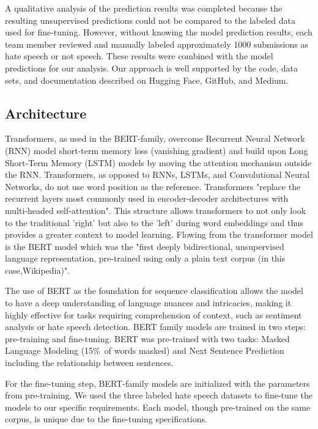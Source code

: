 \documentclass[conference]{IEEEtran}
\begin{document}
A qualitative analysis of the prediction results was completed because the resulting unsupervised predictions could not be compared to the labeled data used for fine-tuning. However, without knowing the model prediction results, each team member reviewed and manually labeled approximately 1000 submissions as hate speech or not speech. These results were combined with the model predictions for our analysis. Our approach is well supported by the code, data sets, and documentation described on Hugging Face\cite{b9}, GitHub\cite{b10}, and Medium\cite{b11}.

\subsection{Architecture}
Transformers, as used in the BERT-family, overcome Recurrent Neural Network (RNN) model short-term memory loss (vanishing gradient) and build upon Long Short-Term Memory (LSTM) models by moving the attention mechanism outside the RNN. Transformers, as opposed to RNNs, LSTMs, and Convolutional Neural Networks, do not use word position as the reference\cite{b12}. Transformers "replace the recurrent layers most commonly used in encoder-decoder architectures with multi-headed self-attention"\cite{b13}. This structure allows transformers to not only look to the traditional 'right' but also to the 'left' during word embeddings and thus provides a greater context to model learning. Flowing from the transformer model is the BERT model which was the "first deeply bidirectional, unsupervised language representation, pre-trained using only a plain text corpus (in this case,Wikipedia)"\cite{b14}.

The use of BERT as the foundation for sequence classification allows the model to have a deep understanding of language nuances and intricacies, making it highly effective for tasks requiring comprehension of context, such as sentiment analysis or hate speech detection\cite{b15}. BERT family models are trained in two steps: pre-training and fine-tuning. BERT was pre-trained with two tasks: Masked Language Modeling (15\%\ of words masked) and Next Sentence Prediction including the relationship between sentences\cite{b12}.  

For the fine-tuning step, BERT-family models are initialized with the parameters from pre-training. We used the three labeled hate speech datasets to fine-tune the models to our specific requirements. Each model, though pre-trained on the same corpus, is unique due to the fine-tuning specifications\cite{b12}.
\end{document}
